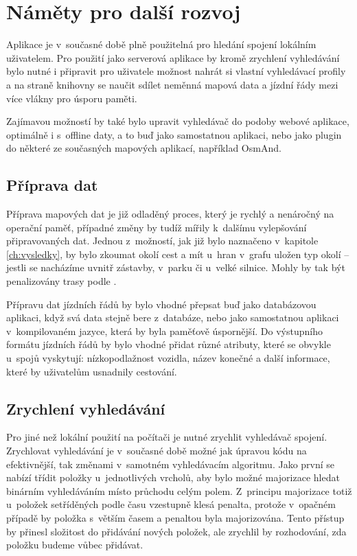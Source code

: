 \section{Náměty pro další rozvoj}
Aplikace je v~současné době plně použitelná pro hledání spojení lokálním
uživatelem. Pro použití jako serverová aplikace by kromě zrychlení vyhledávání
bylo nutné i připravit pro uživatele možnost nahrát si vlastní vyhledávací
profily a na straně knihovny se naučit sdílet neměnná mapová data a jízdní řády
mezi více vlákny pro úsporu paměti. 

Zajímavou možností by také bylo upravit vyhledávač do podoby webové aplikace,
optimálně i s~offline daty, a to buď jako samostatnou aplikaci, nebo jako plugin
do některé ze současných mapových aplikací, například OsmAnd.

\subsection{Příprava dat}
Příprava mapových dat je již odladěný proces, který je rychlý a nenáročný na
operační paměť, případné změny by tudíž mířily k~dalšímu vylepšování
připravovaných dat. Jednou z~možností, jak již bylo naznačeno v~kapitole
\ref{ch:vysledky}, by bylo zkoumat okolí cest a mít u~hran v~grafu uložen typ
okolí -- jestli se nacházíme uvnitř zástavby, v~parku či u~velké silnice. Mohly
by tak být penalizovány trasy podle .

Přípravu dat jízdních řádů by bylo vhodné přepsat buď jako databázovou aplikaci,
když svá data stejně bere z~databáze, nebo jako samostatnou aplikaci
v~kompilovaném jazyce, která by byla paměťově úspornější. Do výstupního formátu
jízdních řádů by bylo vhodné přidat různé atributy, které se obvykle u~spojů
vyskytují: nízkopodlažnost vozidla, název konečné a další informace, které by
uživatelům usnadnily cestování.

\subsection{Zrychlení vyhledávání}
Pro jiné než lokální použití na počítači je nutné zrychlit vyhledávač spojení.
Zrychlovat vyhledávání je v~současné době možné jak úpravou kódu na
efektivnější, tak změnami v~samotném vyhledávacím algoritmu. Jako první se
nabízí třídit položky u~jednotlivých vrcholů, aby bylo možné majorizace hledat
binárním vyhledáváním místo průchodu celým polem. Z~principu majorizace totiž
u~položek setříděných podle času vzestupně klesá penalta, protože v~opačném
případě by položka s~větším časem a penaltou byla majorizována. Tento přístup by
přinesl složitost do přidávání nových položek, ale zrychlil by rozhodování, zda
položku budeme vůbec přidávat. 

